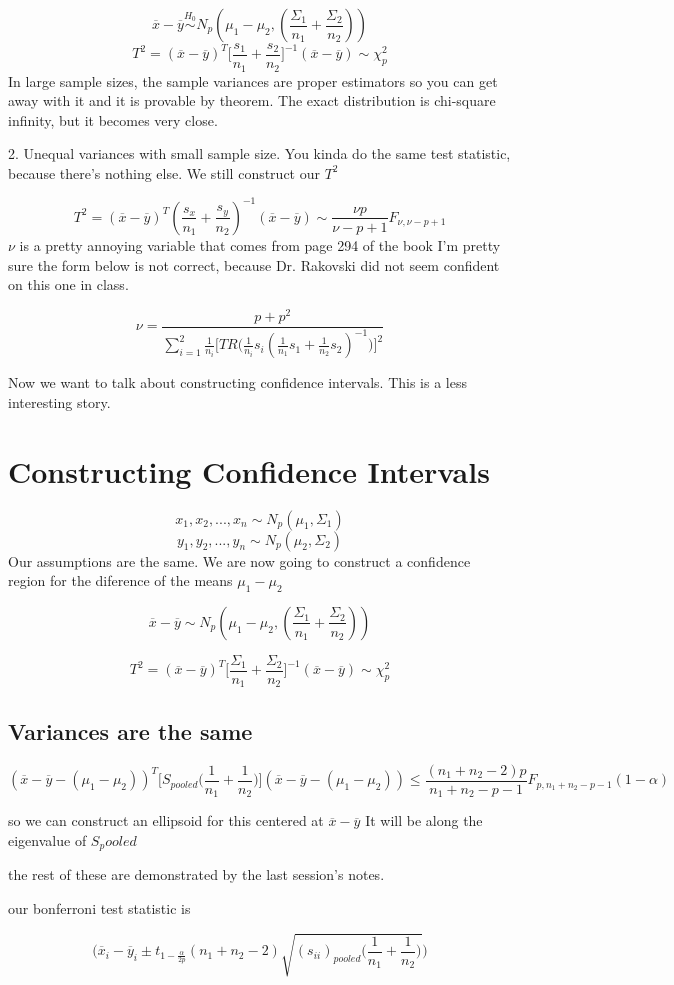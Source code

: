 \[\overline{x} -\overline{y} \overset{H_0}{\sim} N_p(\mu_1-\mu_2,(\frac{\Sigma_1}{n_1}+\frac{\Sigma_2}{n_2}))\]
\[T^2 = (\overline{x}-\overline{y})^T
\Bigg[
\frac{s_1}{n_1}+\frac{s_2}{n_2}
\Bigg]^{-1}
(\overline{x}-\overline{y}) \sim \chi_p^2\]
In large sample sizes, the sample variances are proper estimators so you can get away with it and it is provable by theorem. The exact distribution is chi-square infinity, but it becomes very close.

2. Unequal variances with small sample size. You kinda do the same test statistic, because there's nothing else. 
We still construct our $T^2$

\[T^2 = (\overline{x}- \overline{y})^T 
(\frac{s_x}{n_1}+ \frac{s_y}{n_2})^{-1}
(\overline{x}- \overline{y}) \sim \frac{\nu p}{\nu-p+1} F_{\nu,\nu-p+1}
\]
$\nu$ is a pretty annoying variable that comes from page 294 of the book I'm pretty sure the form below is not correct, because Dr. Rakovski did not seem confident on this one in class.

\[\nu = \frac{p+p^2}
{
\displaystyle\sum_{i=1}^{2}\frac{1}{n_i} 
\Bigg[
TR \Big(
\frac{1}{n_i} s_i (\frac{1}{n_1}s_1 +\frac{1}{n_2}s_2)^{-1}
\Big)
\Bigg]^2
}\]

Now we want to talk about constructing confidence intervals. This is a less interesting story.

\section{Constructing Confidence Intervals}
\[x_1,x_2,...,x_n \sim N_p(\mu_1,\Sigma_1)\]
\[y_1,y_2,...,y_n \sim N_p(\mu_2,\Sigma_2)\]
Our assumptions are the same. We are now going to construct a confidence region for the diference of the means $\mu_1-\mu_2$

\[\overline{x} -\overline{y} \sim N_p(\mu_1-\mu_2,(\frac{\Sigma_1}{n_1}+\frac{\Sigma_2}{n_2}))\]

\[T^2 = (\overline{x}-\overline{y})^T
\Bigg[
\frac{\Sigma_1}{n_1}+\frac{\Sigma_2}{n_2}
\Bigg]^{-1}
(\overline{x}-\overline{y}) \sim \chi_p^2\]
\subsection{Variances are the same}
\[(\overline{x}-\overline{y}-(\mu_1-\mu_2))^T \Big[
S_{pooled} \bigg(\frac{1}{n_1} + \frac{1}{n_2}
\bigg) \Big]
(\overline{x}-\overline{y} -(\mu_1-\mu_2)) \leq \frac{(n_1+n_2-2)p}{n_1+n_2-p-1}F_{p,n_1+n_2-p-1} (1-\alpha)\]

so we can construct an ellipsoid for this centered at $\overline{x}-\overline{y}$ It will be along the eigenvalue of $S_pooled$

the rest of these are demonstrated by the last session's notes.

our bonferroni test statistic is

\[ \Bigg( 
\overline{x}_i - \overline{y}_i
\pm
t_{1-\frac{\alpha}{2p}}(n_1+n_2 -2)\sqrt{(s_{ii})_{pooled} \big(\frac{1}{n_1}+\frac{1}{n_2} \big)}
\Bigg )
\]